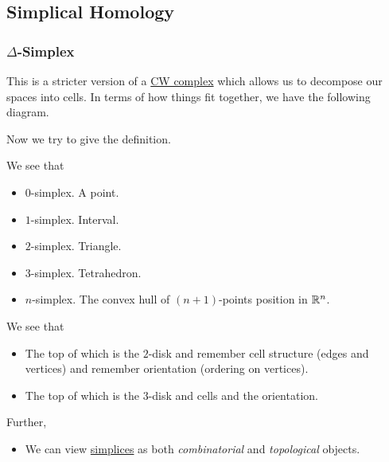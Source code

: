 \subsection{Simplical Homology}
\subsubsection{\(\Delta\)-Simplex}
This is a stricter version of a \hyperref[def:CW-Complex]{CW complex} which allows us to decompose our spaces into cells. In terms of how things fit together, we have
the following diagram.
\begin{figure}[H]
	\centering
	\label{fig:simplical-homology-venn-diagram}
\end{figure}

Now we try to give the definition.
\begin{definition}[Simplex]\label{def:simplex}
	We see that
	\begin{itemize}
		\item \(0\)-simplex. A point.
		\item \(1\)-simplex. Interval.
		\item \(2\)-simplex. Triangle.
		\item \(3\)-simplex. Tetrahedron.
		\item \(n\)-simplex. The convex hull of \((n+1)\)-points position in \(\mathbb{\MakeUppercase{r}} ^n\).
	\end{itemize}
	\begin{figure}[H]
		\centering
		\label{fig:def:simplex}
	\end{figure}
\end{definition}
\begin{remark}
	We see that
	\begin{itemize}
		\item The top of which is the \(2\)-disk and remember cell structure (edges and vertices) and remember orientation (ordering on vertices).
		\item The top of which is the \(3\)-disk and cells and the orientation.
	\end{itemize}
	Further,
	\begin{itemize}
		\item We can view \hyperref[def:simplex]{simplices} as both \emph{combinatorial} and \emph{topological} objects.
	\end{itemize}
\end{remark}

